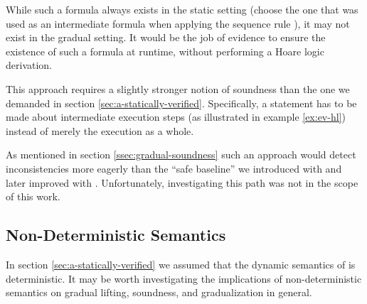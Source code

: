 \begin{description}
\begin{example}{}
        While such a formula always exists in the static setting (choose the one that was used as an intermediate formula when applying the sequence rule ), it may not exist in the gradual setting.
        It would be the job of evidence to ensure the existence of such a formula at runtime, without performing a Hoare logic derivation.
    \end{example}
    
    This approach requires a slightly stronger notion of soundness than the one we demanded in section \ref{sec:a-statically-verified}.
    Specifically, a statement has to be made about intermediate execution steps (as illustrated in example \ref{ex:ev-hl}) instead of merely the execution as a whole.
    
    As mentioned in section \ref{ssec:gradual-soundness} such an approach would detect inconsistencies more eagerly than the “safe baseline” we introduced with  and later improved with .
    Unfortunately, investigating this path was not in the scope of this work.
\end{description}

\subsection{Non-Deterministic Semantics}\label{ssec:nd-semantics}
In section \ref{sec:a-statically-verified} we assumed that the dynamic semantics of \svl is deterministic.
It may be worth investigating the implications of non-deterministic semantics on gradual lifting, soundness, and gradualization in general.

